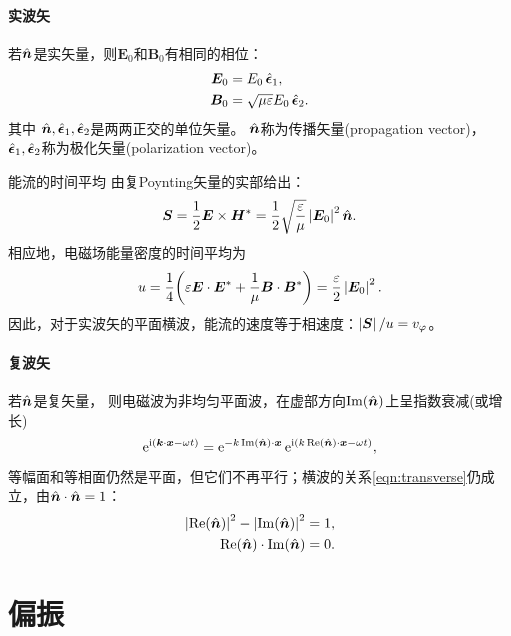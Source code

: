\paragraph{实波矢}

若$\mathop{}\!\hat{\bm{n}}$是实矢量，则$\bm E_0$和$\bm B_0$有相同的相位：
\begin{subequations}
    \begin{align}
        \bm E_0&=E_0\mathop{}\!\hat{\bm{\epsilon}}_1,\\
        \bm B_0&=\sqrt{\mu\varepsilon}E_0\mathop{}\!\hat{\bm{\epsilon}}_2.
    \end{align}
\end{subequations}
其中
$\mathop{}\!\hat{\bm{n}},\mathop{}\!\hat{\bm{\epsilon}}_1,\mathop{}\!\hat{\bm{\epsilon}}_2$是两两正交的单位矢量。
$\mathop{}\!\hat{\bm{n}}$称为传播矢量(propagation vector)，
$\mathop{}\!\hat{\bm{\epsilon}}_1,\mathop{}\!\hat{\bm{\epsilon}}_2$称为极化矢量(polarization vector)。

能流的时间平均%
由复Poynting矢量的实部给出：
\begin{equation}
    \bm S=\frac12\bm E\times\bm H^\ast=\frac12\sqrt{\frac\varepsilon\mu}\left\lvert\bm E_0\right\rvert^2\mathop{}\!\hat{\bm{n}}.
\end{equation}
相应地，电磁场能量密度的时间平均为
\begin{equation}
    u=\frac14\biggl(\varepsilon\bm E\cdot\bm E^\ast+\frac1\mu\bm B\cdot\bm B^\ast\biggr)=\frac\varepsilon 2\left\lvert\bm E_0\right\rvert^2.
\end{equation}
因此，对于实波矢的平面横波，能流的速度等于相速度：$\left\lvert\bm S\right\rvert/u=v_\varphi$。

\paragraph{复波矢}

若$\mathop{}\!\hat{\bm{n}}$是复矢量，
则电磁波为非均匀平面波，在虚部方向$\operatorname{Im}(\mathop{}\!\hat{\bm{n}})$上呈指数衰减(或增长)
\[
    \mathop{}\!\mathrm{e}^{\mathrm{i}(\bm k\cdot\bm x-\omega t)}=\mathop{}\!\mathrm{e}^{-k\operatorname{Im}(\mathop{}\!\hat{\bm{n}})\cdot\bm x}\mathop{}\!\mathrm{e}^{\mathrm{i}(k\operatorname{Re}(\mathop{}\!\hat{\bm{n}})\cdot\bm x-\omega t)},
\]
等幅面和等相面仍然是平面，但它们不再平行；横波的关系\eqref{eqn:transverse}仍成立，由$\mathop{}\!\hat{\bm{n}}\cdot\mathop{}\!\hat{\bm{n}}=1$：
\begin{subequations}
    \begin{align}
        \left\lvert\operatorname{Re}(\mathop{}\!\hat{\bm{n}})\right\rvert^2-\left\lvert\operatorname{Im}(\mathop{}\!\hat{\bm{n}})\right\rvert^2&=1,\\
        \operatorname{Re}(\mathop{}\!\hat{\bm{n}})\cdot\operatorname{Im}(\mathop{}\!\hat{\bm{n}})&=0.
    \end{align}
\end{subequations}

\section{偏振}

